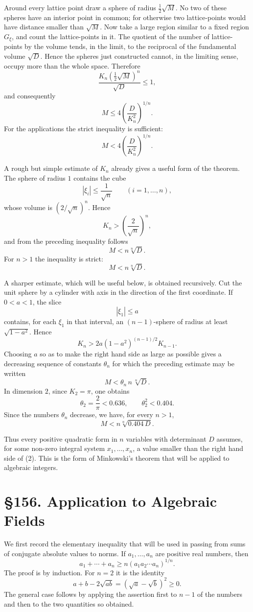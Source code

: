 \documentclass[11pt,a4paper]{book}
\newcommand{\webersection}[2]{\clearpage\section*{\S #1. #2}}
\begin{document}
Around every lattice point draw a sphere of radius \(\frac12\sqrt M\).  No two of these spheres have an interior point in common; for otherwise two lattice-points would have distance smaller than \(\sqrt M\).  Now take a large region similar to a fixed region \(G_\xi\), and count the lattice-points in it.  The quotient of the number of lattice-points by the volume tends, in the limit, to the reciprocal of the fundamental volume \(\sqrt D\).  Hence the spheres just constructed cannot, in the limiting sense, occupy more than the whole space.  Therefore
\[
  \frac{K_n \left(\frac12\sqrt M\right)^n}{\sqrt D}\le 1,
\]
and consequently
\[
  M\le 4\left(\frac{D}{K_n^2}\right)^{1/n}.
\]
For the applications the strict inequality is sufficient:
\[
  M<4\left(\frac{D}{K_n^2}\right)^{1/n}.
\]

A rough but simple estimate of \(K_n\) already gives a useful form of the theorem.  The sphere of radius \(1\) contains the cube
\[
  |\xi_i|\le \frac1{\sqrt n}\qquad (i=1,\ldots,n),
\]
whose volume is \((2/\sqrt n)^n\).  Hence
\[
  K_n>\left(\frac2{\sqrt n}\right)^n,
\]
and from the preceding inequality follows
\[
  M<n\sqrt[n]{D}.
\]
For \(n>1\) the inequality is strict:
\[
  M<n\sqrt[n]{D}.
\tag{1}
\]

A sharper estimate, which will be useful below, is obtained recursively.  Cut the unit sphere by a cylinder with axis in the direction of the first coordinate.  If \(0<a<1\), the slice
\[
  |\xi_1|\le a
\]
contains, for each \(\xi_1\) in that interval, an \((n-1)\)-sphere of radius at least \(\sqrt{1-a^2}\).  Hence
\[
  K_n>2a(1-a^2)^{(n-1)/2}K_{n-1}.
\]
Choosing \(a\) so as to make the right hand side as large as possible gives a decreasing sequence of constants \(\theta_n\) for which the preceding estimate may be written
\[
  M<\theta_n\, n\,\sqrt[n]{D}.
\]
In dimension \(2\), since \(K_2=\pi\), one obtains
\[
  \theta_2=\frac{2}{\pi}<0.636,\qquad \theta_2^2<0.404.
\]
Since the numbers \(\theta_n\) decrease, we have, for every \(n>1\),
\[
  M<n\sqrt[n]{0.404\,D}.
\tag{2}
\]

Thus every positive quadratic form in \(n\) variables with determinant \(D\) assumes, for some non-zero integral system \(x_1,\ldots,x_n\), a value smaller than the right hand side of (2).  This is the form of Minkowski's theorem that will be applied to algebraic integers.

\webersection{156}{Application to Algebraic Fields}

We first record the elementary inequality that will be used in passing from sums of conjugate absolute values to norms.  If \(a_1,\ldots,a_n\) are positive real numbers, then
\[
  a_1+\cdots+a_n\ge n(a_1a_2\cdots a_n)^{1/n}.
\tag{1}
\]
The proof is by induction.  For \(n=2\) it is the identity
\[
  a+b-2\sqrt{ab}=(\sqrt a-\sqrt b)^2\ge 0.
\]
The general case follows by applying the assertion first to \(n-1\) of the numbers and then to the two quantities so obtained.
\end{document}

